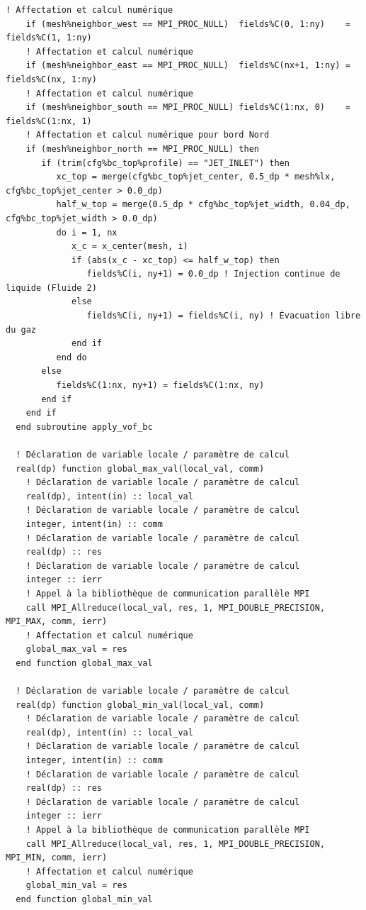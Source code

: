 \documentclass[10pt,a4paper,oneside]{book}
\begin{document}
\begin{lstlisting}[language={[95]Fortran}]
    ! Affectation et calcul numérique
    if (mesh%neighbor_west == MPI_PROC_NULL)  fields%C(0, 1:ny)    = fields%C(1, 1:ny)
    ! Affectation et calcul numérique
    if (mesh%neighbor_east == MPI_PROC_NULL)  fields%C(nx+1, 1:ny) = fields%C(nx, 1:ny)
    ! Affectation et calcul numérique
    if (mesh%neighbor_south == MPI_PROC_NULL) fields%C(1:nx, 0)    = fields%C(1:nx, 1)
    ! Affectation et calcul numérique pour bord Nord
    if (mesh%neighbor_north == MPI_PROC_NULL) then
       if (trim(cfg%bc_top%profile) == "JET_INLET") then
          xc_top = merge(cfg%bc_top%jet_center, 0.5_dp * mesh%lx, cfg%bc_top%jet_center > 0.0_dp)
          half_w_top = merge(0.5_dp * cfg%bc_top%jet_width, 0.04_dp, cfg%bc_top%jet_width > 0.0_dp)
          do i = 1, nx
             x_c = x_center(mesh, i)
             if (abs(x_c - xc_top) <= half_w_top) then
                fields%C(i, ny+1) = 0.0_dp ! Injection continue de liquide (Fluide 2)
             else
                fields%C(i, ny+1) = fields%C(i, ny) ! Évacuation libre du gaz
             end if
          end do
       else
          fields%C(1:nx, ny+1) = fields%C(1:nx, ny)
       end if
    end if
  end subroutine apply_vof_bc

  ! Déclaration de variable locale / paramètre de calcul
  real(dp) function global_max_val(local_val, comm)
    ! Déclaration de variable locale / paramètre de calcul
    real(dp), intent(in) :: local_val
    ! Déclaration de variable locale / paramètre de calcul
    integer, intent(in) :: comm
    ! Déclaration de variable locale / paramètre de calcul
    real(dp) :: res
    ! Déclaration de variable locale / paramètre de calcul
    integer :: ierr
    ! Appel à la bibliothèque de communication parallèle MPI
    call MPI_Allreduce(local_val, res, 1, MPI_DOUBLE_PRECISION, MPI_MAX, comm, ierr)
    ! Affectation et calcul numérique
    global_max_val = res
  end function global_max_val

  ! Déclaration de variable locale / paramètre de calcul
  real(dp) function global_min_val(local_val, comm)
    ! Déclaration de variable locale / paramètre de calcul
    real(dp), intent(in) :: local_val
    ! Déclaration de variable locale / paramètre de calcul
    integer, intent(in) :: comm
    ! Déclaration de variable locale / paramètre de calcul
    real(dp) :: res
    ! Déclaration de variable locale / paramètre de calcul
    integer :: ierr
    ! Appel à la bibliothèque de communication parallèle MPI
    call MPI_Allreduce(local_val, res, 1, MPI_DOUBLE_PRECISION, MPI_MIN, comm, ierr)
    ! Affectation et calcul numérique
    global_min_val = res
  end function global_min_val


\end{lstlisting}
\end{document}
